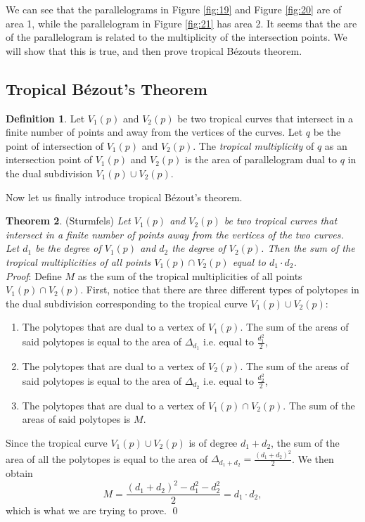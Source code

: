 \documentclass[]{article}
\theoremstyle{definition}
\numberwithin{equation}{section}
\newtheorem{thm}{Theorem}[section]
\newtheorem{defn}[thm]{Definition}
\renewcommand{\.}{\,.}
\begin{document}
\hspace{3mm}We can see that the parallelograms in Figure \ref{fig:19} and Figure \ref{fig:20} are of area 1, while the parallelogram in Figure \ref{fig:21} has area 2. It seems that the are of the parallelogram is related to the multiplicity of the intersection points. We will show that this is true, and then prove tropical B\'ezouts theorem.
\subsection{Tropical B\'ezout's Theorem}
\begin{defn} Let $V_1(p)$ and $V_2(p)$ be two tropical curves that intersect in a finite number of points and away from the vertices of the curves.  Let $q$ be the point of intersection of $V_1(p)$ and $V_2(p)$. The \emph{tropical multiplicity} of $q$ as an intersection point of $V_1(p)$ and $V_2(p)$ is the area of parallelogram dual to $q$ in the dual subdivision $V_1(p)\cup V_2(p)$.
	\end{defn}
\hspace{3mm} Now let us finally introduce tropical B\'ezout's theorem.
\begin{thm}
	(Sturmfels) \emph{Let $V_1(p)$ and $V_2(p)$ be two tropical curves that intersect in a finite number of points away  from the vertices of the two curves. Let $d_1$ be the degree of $V_1(p)$ and $d_2$ the degree of $V_2(p)$. Then the sum of the tropical multiplicities of all points $V_1(p)\cap V_2(p)$ equal to $d_1\cdot d_2$.} \\
\hspace*{3mm} \emph{Proof}: Define $M$ as the sum of the tropical multiplicities of all points $V_1(p)\cap V_2(p)$. First, notice that there are three different types of polytopes in the dual subdivision corresponding to the tropical curve $V_1(p)\cup V_2(p)$:
\begin{enumerate}[noitemsep,topsep=-6pt]
\item \vspace{0.75mm}
The polytopes that are dual to a vertex of $V_1(p)$. The sum of the areas of said polytopes is equal to the area of $\Delta_{d_1}$ i.e. equal to $\frac{d^2_1}{2}$,
\vspace{2mm}
\item The polytopes that are dual to a vertex of $V_2(p)$. The sum of the areas of said polytopes is equal to the area of $\Delta_{d_2}$ i.e. equal to $\frac{d^2_2}{2}$,
\vspace{2mm}
\item The polytopes that are dual to a vertex of $V_1(p)\cap V_2(p)$. The sum of the areas of said polytopes is $M$.
\end{enumerate}
Since the tropical curve $V_1(p)\cup V_2(p)$ is of degree $d_1+d_2$, the sum of the area of all the polytopes is equal to the area of $\Delta_{d_1+d_2}=\frac{(d_1+d_2)^2}{2}$. We then obtain
\begin{equation}
	M=\frac{(d_1+d_2)^2-d^2_1-d^2_2}{2}=d_1\cdot d_2,
\end{equation}
which is what we are trying to prove. \qed
\end{thm}
\end{document}
